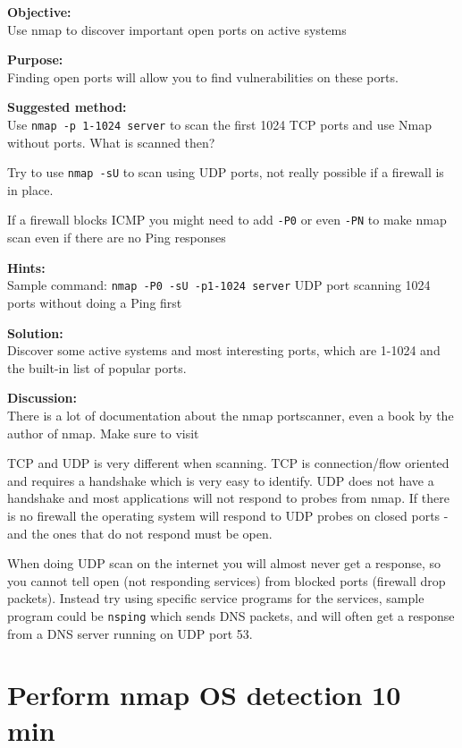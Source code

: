 \documentclass[a4paper,11pt,notitlepage]{report}
\begin{document}
{\bf Objective:} \\
Use nmap to discover important open ports on active systems

{\bf Purpose:}\\
Finding open ports will allow you to find vulnerabilities on these ports.

{\bf Suggested method:}\\
Use \verb+nmap -p 1-1024 server+ to scan the first 1024 TCP
ports and use Nmap without ports. What is scanned then?

Try to use \verb+nmap -sU+ to scan using UDP ports, not really possible if a firewall is in place.

If a firewall blocks ICMP you might need to add \verb+-P0+
or even \verb+-PN+ to make nmap scan even if there are no Ping responses

{\bf Hints:} \\
Sample command: \verb+nmap -P0 -sU -p1-1024 server+ UDP port scanning
1024 ports without doing a Ping first

{\bf Solution:}\\
Discover some active systems and most interesting ports, which are 1-1024 and the built-in list of popular ports.

{\bf Discussion:}\\
There is a lot of documentation about the nmap portscanner, even a book by the author
of nmap. Make sure to visit 

TCP and UDP is very different when scanning. TCP is connection/flow oriented and requires a handshake which is very easy to identify. UDP does not have a handshake and most applications will not respond to probes from nmap. If there is no firewall the operating system will respond to UDP probes on closed ports - and the ones that do not respond must be open.

When doing UDP scan on the internet you will almost never get a response, so you cannot tell open (not responding services) from blocked ports (firewall drop packets). Instead try using specific service programs for the services, sample program could be \verb+nsping+ which sends DNS packets, and will often get a response from a DNS server running on UDP port 53.

\chapter{Perform nmap OS detection 10 min}
\label{ex:nmap-os}
\end{document}
